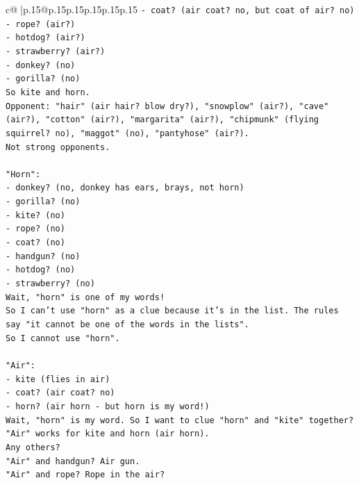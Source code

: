 \documentclass{article}
\begin{document}
{\begin{supertabular}{c@{$\;$}|p{.15\linewidth}@{}p{.15\linewidth}p{.15\linewidth}p{.15\linewidth}p{.15\linewidth}p{.15\linewidth}}
{{{\texttt{{-} coat? (air coat? no, but coat of air? no)} \\
\texttt{{-} rope? (air?)} \\
\texttt{{-} hotdog? (air?)} \\
\texttt{{-} strawberry? (air?)} \\
\texttt{{-} donkey? (no)} \\
\texttt{{-} gorilla? (no)} \\
\texttt{So kite and horn.} \\
\texttt{Opponent: "hair" (air hair? blow dry?), "snowplow" (air?), "cave" (air?), "cotton" (air?), "margarita" (air?), "chipmunk" (flying squirrel? no), "maggot" (no), "pantyhose" (air?).} \\
\texttt{Not strong opponents.} \\
\\ 
\texttt{"Horn":} \\
\texttt{{-} donkey? (no, donkey has ears, brays, not horn)} \\
\texttt{{-} gorilla? (no)} \\
\texttt{{-} kite? (no)} \\
\texttt{{-} rope? (no)} \\
\texttt{{-} coat? (no)} \\
\texttt{{-} handgun? (no)} \\
\texttt{{-} hotdog? (no)} \\
\texttt{{-} strawberry? (no)} \\
\texttt{Wait, "horn" is one of my words!} \\
\texttt{So I can't use "horn" as a clue because it's in the list. The rules say "it cannot be one of the words in the lists".} \\
\texttt{So I cannot use "horn".} \\
\\ 
\texttt{"Air":} \\
\texttt{{-} kite (flies in air)} \\
\texttt{{-} coat? (air coat? no)} \\
\texttt{{-} horn? (air horn {-} but horn is my word!)} \\
\texttt{Wait, "horn" is my word. So I want to clue "horn" and "kite" together?} \\
\texttt{"Air" works for kite and horn (air horn).} \\
\texttt{Any others?} \\
\texttt{"Air" and handgun? Air gun.} \\
\texttt{"Air" and rope? Rope in the air?} \\
}}}
\end{supertabular}}
\end{document}
